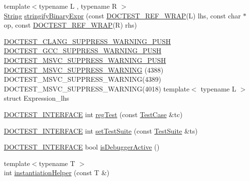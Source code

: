 \begin{DoxyCompactItemize}
\item 
{\footnotesize template$<$typename L , typename R $>$ }\\\hyperlink{classdoctest_1_1String}{String} \hyperlink{namespacedoctest_1_1detail_a6879a79aea397a22e296e4afd0a90e3b}{stringify\+Binary\+Expr} (const \hyperlink{doctest_8h_af2901cafb023c57fb672ccb1bf14f2eb}{D\+O\+C\+T\+E\+S\+T\+\_\+\+R\+E\+F\+\_\+\+W\+R\+AP}(L) lhs, const char $\ast$op, const \hyperlink{doctest_8h_af2901cafb023c57fb672ccb1bf14f2eb}{D\+O\+C\+T\+E\+S\+T\+\_\+\+R\+E\+F\+\_\+\+W\+R\+AP}(R) rhs)
\item 
\hyperlink{doctest_8h_a628491cf2971a026350d5401986bf6d3}{D\+O\+C\+T\+E\+S\+T\+\_\+\+C\+L\+A\+N\+G\+\_\+\+S\+U\+P\+P\+R\+E\+S\+S\+\_\+\+W\+A\+R\+N\+I\+N\+G\+\_\+\+P\+U\+SH} \hyperlink{doctest_8h_a8015d10af2883db80a955ce0d523886d}{D\+O\+C\+T\+E\+S\+T\+\_\+\+G\+C\+C\+\_\+\+S\+U\+P\+P\+R\+E\+S\+S\+\_\+\+W\+A\+R\+N\+I\+N\+G\+\_\+\+P\+U\+SH} \hyperlink{doctest_8h_aec6d713a9dde361b8e68afe78c5bf3cf}{D\+O\+C\+T\+E\+S\+T\+\_\+\+M\+S\+V\+C\+\_\+\+S\+U\+P\+P\+R\+E\+S\+S\+\_\+\+W\+A\+R\+N\+I\+N\+G\+\_\+\+P\+U\+SH} \hyperlink{namespacedoctest_1_1detail_a3b966d87ac1e25498fae773355c43d90}{D\+O\+C\+T\+E\+S\+T\+\_\+\+M\+S\+V\+C\+\_\+\+S\+U\+P\+P\+R\+E\+S\+S\+\_\+\+W\+A\+R\+N\+I\+NG} (4388) D\+O\+C\+T\+E\+S\+T\+\_\+\+M\+S\+V\+C\+\_\+\+S\+U\+P\+P\+R\+E\+S\+S\+\_\+\+W\+A\+R\+N\+I\+NG(4389) D\+O\+C\+T\+E\+S\+T\+\_\+\+M\+S\+V\+C\+\_\+\+S\+U\+P\+P\+R\+E\+S\+S\+\_\+\+W\+A\+R\+N\+I\+NG(4018) template$<$ typename L $>$ struct Expression\+\_\+lhs
\item 
\hyperlink{doctest_8h_a9c16ffc635ec47f07797d21ede26b1a5}{D\+O\+C\+T\+E\+S\+T\+\_\+\+I\+N\+T\+E\+R\+F\+A\+CE} int \hyperlink{namespacedoctest_1_1detail_a00f99edefb8490a8e2602d58c96431f4}{reg\+Test} (const \hyperlink{structdoctest_1_1detail_1_1TestCase}{Test\+Case} \&tc)
\item 
\hyperlink{doctest_8h_a9c16ffc635ec47f07797d21ede26b1a5}{D\+O\+C\+T\+E\+S\+T\+\_\+\+I\+N\+T\+E\+R\+F\+A\+CE} int \hyperlink{namespacedoctest_1_1detail_ae79cb8df06d35468dd0ba9f04c85802c}{set\+Test\+Suite} (const \hyperlink{structdoctest_1_1detail_1_1TestSuite}{Test\+Suite} \&ts)
\item 
\hyperlink{doctest_8h_a9c16ffc635ec47f07797d21ede26b1a5}{D\+O\+C\+T\+E\+S\+T\+\_\+\+I\+N\+T\+E\+R\+F\+A\+CE} bool \hyperlink{namespacedoctest_1_1detail_a013828c4e677241cc26aeea33f762710}{is\+Debugger\+Active} ()
\item 
{\footnotesize template$<$typename T $>$ }\\int \hyperlink{namespacedoctest_1_1detail_aad401b097a9af4df1d4a9d0911957c0f}{instantiation\+Helper} (const T \&)

\end{DoxyCompactItemize}
